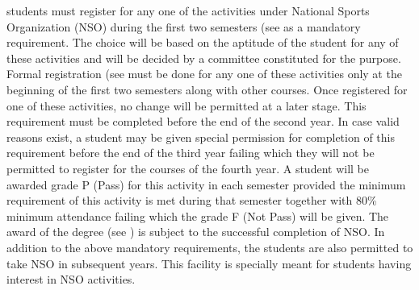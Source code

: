 \Glspl{student} must register for any one of the activities under National Sports Organization (NSO) during the first two semesters (see  as a mandatory requirement. The choice will be based on the aptitude of the \gls{student} for any of these activities and will be decided by a committee constituted for the purpose. Formal registration (see  must be done for any one of these activities only at the beginning of the first two semesters along with other courses. Once registered for one of these activities, no change will be permitted at a later stage. This requirement must be completed before the end of the second year. In case valid reasons exist, a student may be given special permission for completion of this requirement before the end of the third year failing which they will not be permitted to register for the courses of the fourth year. A \gls{student} will be awarded grade P (Pass) for this activity in each semester provided the minimum requirement of this activity is met during that semester together with 80\% minimum attendance failing which the grade F (Not Pass) will be given. The award of the degree (see ) is subject to the successful completion of NSO. In addition to the above mandatory requirements, the students are also permitted to take NSO in subsequent years. This facility is specially meant for students having interest in NSO activities.